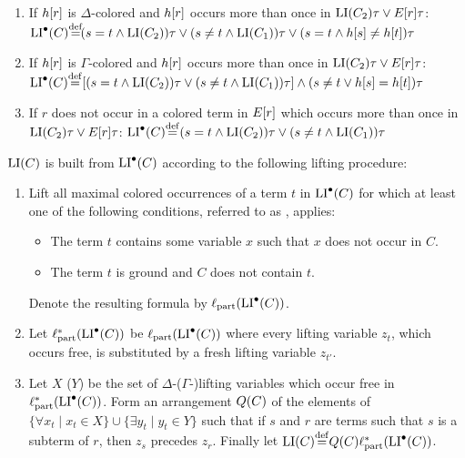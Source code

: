 \begin{defi}
\begin{description}
			\begin{enumerate}

				\item If $h[r]$ is $\Delta$-colored and $h[r]$ occurs more than once in $\operatorname{LI}(C_2)\tau \lor E[r]\tau$:
					\newline
					$\LIpre(C) \defeq  ( s=t \land \LI(C_2) )\tau \lor (s\neq t \land \LI(C_1))\tau \lor (s=t \land h\occur{s} \neq      h\occur{t})\tau$

				\item If $h[r]$ is $\Gamma$-colored and $h[r]$ occurs more than once in $\operatorname{LI}(C_2)\tau \lor E[r]\tau$:
					\newline
					$\LIpre(C)\defeq{} [ ( s=t \land \LI(C_2) )\tau \lor (s\neq t \land \LI(C_1))\tau ] \land\allowbreak (s\neq t \lor h\occur{s} = h\occur{t})\tau$

				\item If $r$ does not occur in a colored term in $E[r]$ which occurs more than once in $\operatorname{LI}(C_2)\tau \lor E[r]\tau$:
					\newline
					$\LIpre(C) \defeq{} ( s=t \land \LI(C_2) )\tau \lor (s\neq t \land \LI(C_1))\tau $ 

			\end{enumerate}
	\end{description}

	\noindent
	$\operatorname{LI}(C)$ is built from $\operatorname{LI}^\bullet(C)$ according to the following lifting procedure:

	\begin{enumerate}
		\item Lift all maximal colored occurrences of a term $t$ in $\operatorname{LI}^\bullet(C)$ for which at least one of the following conditions, referred to as , applies:
			\begin{itemize} 
				\item The term $t$ contains some variable $x$ such that $x$ does not occur in $C$.
				\item The term $t$ is ground and $C$ does not contain $t$.
			\end{itemize} 
			Denote the resulting formula by $\ell_\mathrm{part}(\operatorname{LI}^\bullet(C))$.

		\item 
Let $\ell_\mathrm{part}^*(\operatorname{LI}^\bullet(C))$ be 
$\ell_\mathrm{part}(\operatorname{LI}^\bullet(C))$  where every lifting variable $z_t$, which occurs free, is substituted by a fresh lifting variable $z_{t'}$.
\label{lemma_part_renaming}

		\item Let $X$ ($Y$) be the set of $\Delta$-($\Gamma$-)lifting variables which occur free in  
			$\ell_\mathrm{part}^*(\operatorname{LI}^\bullet(C))$.
			Form an arrangement $Q(C)$ of the elements of $\{\forall x_t \mid x_t \in X\}\cup\allowbreak\{\exists y_t \mid y_t \in Y\}$ such that if $s$ and $r$ are terms such that $s$ is a subterm of $r$, then $z_s$ precedes $z_r$.
			Finally let $\LI(C) \defeq Q(C) \lifsym_\mathrm{part}^*(\LIpre(C))$.
			\qedhere
	\end{enumerate}
\end{defi}


